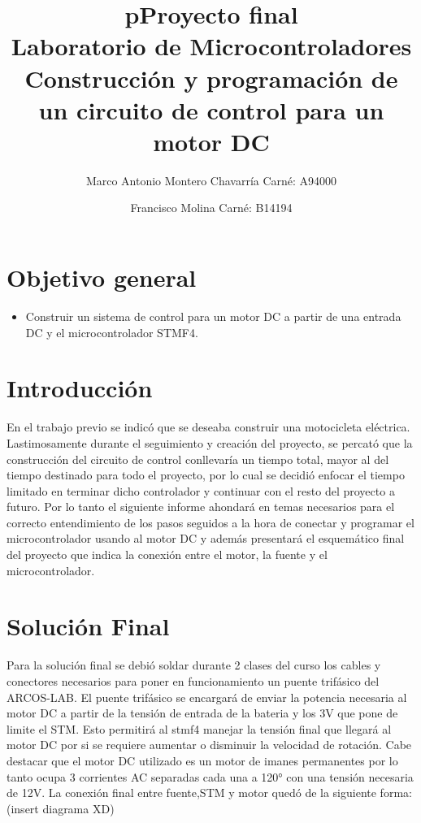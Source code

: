 \documentclass[letterpaper]{article}
\begin{document}
\title{pProyecto final\\ Laboratorio de Microcontroladores\\ Construcción y programación de un circuito de control para un motor DC}
\author{
 Marco Antonio Montero Chavarrí­a Carné: A94000\\
 \and
 Francisco Molina Carné: B14194}
\maketitle

\section{Objetivo general}
\begin{itemize}
\item Construir un sistema de control para un motor DC a partir de una entrada DC y el microcontrolador STMF4.
\end{itemize}

\section{Introducción}

En el trabajo previo se indicó que se deseaba construir una motocicleta eléctrica. Lastimosamente durante el seguimiento y creación del proyecto, se percató que la
construcción del circuito de control conllevaría un tiempo total, mayor al del tiempo destinado para todo el proyecto, por lo cual se decidió enfocar el tiempo limitado
en terminar dicho controlador y continuar con el resto del proyecto a futuro. 
Por lo tanto el siguiente informe ahondará en temas necesarios para el correcto entendimiento de los pasos seguidos 
a la hora de conectar y programar el microcontrolador usando al motor DC y además presentará el esquemático final del proyecto que indica la conexión entre 
el motor, la fuente y el microcontrolador.

\section{Solución Final}
Para la solución final se debió soldar durante 2 clases del curso los cables y conectores necesarios para poner en funcionamiento un puente trifásico del ARCOS-LAB. El puente
trifásico se encargará de enviar la potencia necesaria al motor DC a partir de la tensión de entrada de la bateria y los 3V que pone de limite el STM.
Esto permitirá al stmf4 manejar la tensión final que llegará al motor DC por si se requiere aumentar o disminuir la velocidad de rotación.
Cabe destacar que el motor DC utilizado es un motor de imanes permanentes por lo tanto ocupa 3 corrientes AC separadas cada una a 120° con una tensión necesaria de 12V. La conexión final entre fuente,STM y motor quedó de la siguiente forma:
 (insert diagrama XD)
 
\end{document}
